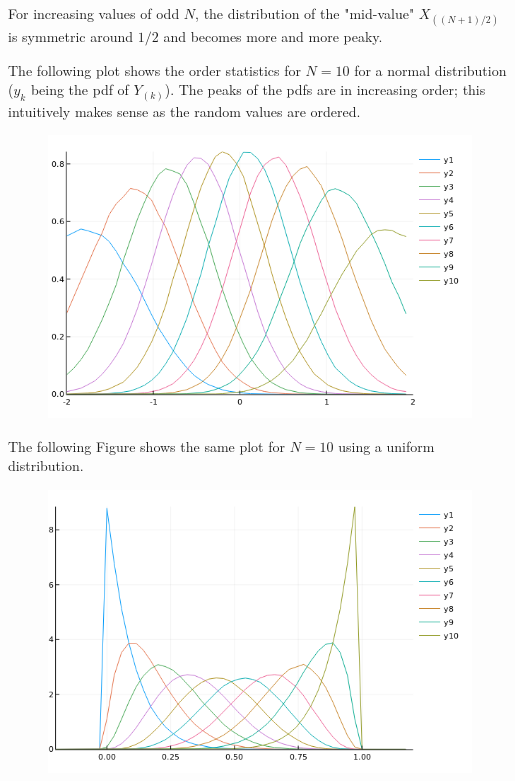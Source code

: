 For increasing values of odd $N$, the distribution of the "mid-value" $X_{((N+1)/2)}$ is symmetric around $1/2$ and becomes more and more peaky.

The following plot shows the order statistics for $N=10$ for a normal distribution ($y_k$ being the pdf of $Y_{(k)}$). The peaks of the pdfs are in increasing order; this intuitively makes sense as the random values are ordered.


\begin{figure}[H]
	\centering
	\includegraphics[scale=0.7]{images/order_stat_2_2.png}
\end{figure}


The following Figure shows the same plot for $N=10$ using a uniform distribution.

\begin{figure}[H]
	\centering
	\includegraphics[scale=0.7]{images/order_stat_2_3.png}
\end{figure}

